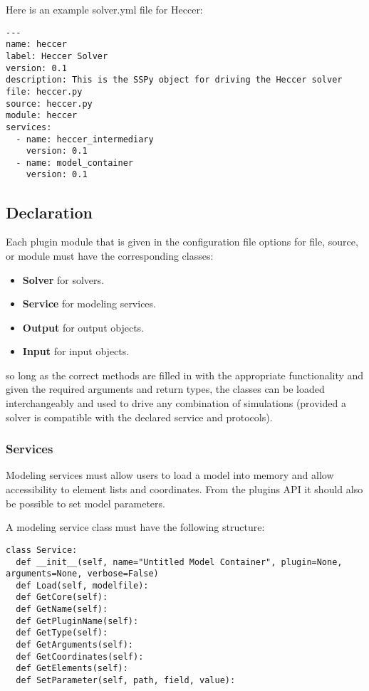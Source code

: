 \documentclass[12pt]{article}
\begin{document}
Here is an example solver.yml file for Heccer:

\begin{verbatim}
---
name: heccer
label: Heccer Solver
version: 0.1
description: This is the SSPy object for driving the Heccer solver
file: heccer.py
source: heccer.py
module: heccer
services:
  - name: heccer_intermediary
    version: 0.1
  - name: model_container
    version: 0.1

\end{verbatim}


\subsection*{Declaration}

Each plugin module that is given in the configuration file options for file, source, or module must have the corresponding classes:

\begin{itemize}
	\item[] {\bf Solver} for solvers.
	\item[] {\bf Service} for modeling services.
	\item[] {\bf Output} for output objects.
	\item[] {\bf Input} for input objects.
\end{itemize}

so long as the correct methods are filled in with the appropriate functionality and given the required arguments and return types,  the classes can be loaded interchangeably and used to drive any combination of simulations (provided a solver is compatible with the declared service and protocols). 


\subsubsection*{Services}

Modeling services must allow users to load a model into memory and allow accessibility to element lists and coordinates.  From the plugins API it should also be possible to set model parameters.

A modeling service class must have the following structure:

\begin{verbatim}
class Service:
  def __init__(self, name="Untitled Model Container", plugin=None, arguments=None, verbose=False)
  def Load(self, modelfile):
  def GetCore(self):
  def GetName(self):
  def GetPluginName(self):
  def GetType(self):
  def GetArguments(self):
  def GetCoordinates(self):
  def GetElements(self):
  def SetParameter(self, path, field, value):
\end{verbatim}
\end{document}
